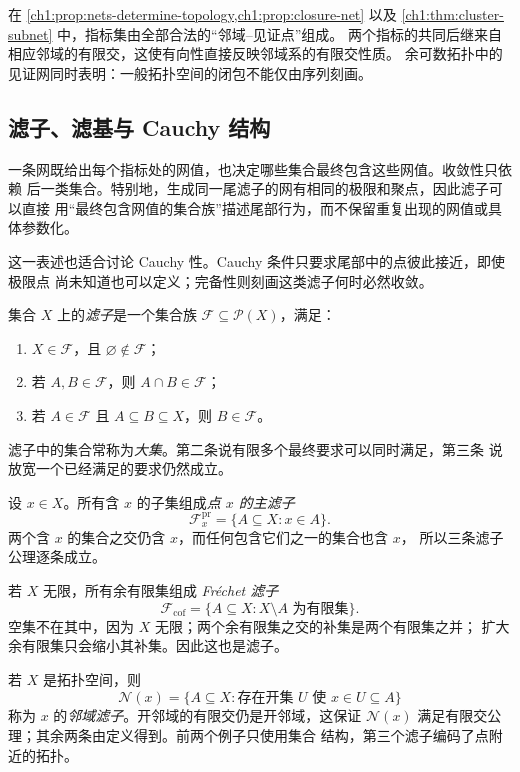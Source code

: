 \begin{remark}[见证网的构造]
在 \cref{ch1:prop:nets-determine-topology,ch1:prop:closure-net} 以及
\cref{ch1:thm:cluster-subnet} 中，指标集由全部合法的“邻域--见证点”组成。
两个指标的共同后继来自相应邻域的有限交，这使有向性直接反映邻域系的有限交性质。
余可数拓扑中的见证网同时表明：一般拓扑空间的闭包不能仅由序列刻画。
\end{remark}


\subsection{滤子、滤基与 Cauchy 结构}
\label{ch1:subsec:filters}

一条网既给出每个指标处的网值，也决定哪些集合最终包含这些网值。收敛性只依赖
后一类集合。特别地，生成同一尾滤子的网有相同的极限和聚点，因此滤子可以直接
用“最终包含网值的集合族”描述尾部行为，而不保留重复出现的网值或具体参数化。

这一表述也适合讨论 Cauchy 性。Cauchy 条件只要求尾部中的点彼此接近，即使极限点
尚未知道也可以定义；完备性则刻画这类滤子何时必然收敛。

\begin{definition}[滤子]
集合 \(X\) 上的\emph{滤子}是一个集合族
\(\mathcal F\subseteq\mathcal P(X)\)，满足：
\begin{enumerate}
  \item \(X\in\mathcal F\)，且 \(\varnothing\notin\mathcal F\)；
  \item 若 \(A,B\in\mathcal F\)，则 \(A\cap B\in\mathcal F\)；
  \item 若 \(A\in\mathcal F\) 且 \(A\subseteq B\subseteq X\)，则
        \(B\in\mathcal F\)。
\end{enumerate}
滤子中的集合常称为\emph{大集}。第二条说有限多个最终要求可以同时满足，第三条
说放宽一个已经满足的要求仍然成立。
\end{definition}

\begin{example}[三个基本滤子]
设 \(x\in X\)。所有含 \(x\) 的子集组成\emph{点 \(x\) 的主滤子}
\[
 \mathcal F_x^{\mathrm{pr}}=\{A\subseteq X:x\in A\}.
\]
两个含 \(x\) 的集合之交仍含 \(x\)，而任何包含它们之一的集合也含 \(x\)，
所以三条滤子公理逐条成立。

若 \(X\) 无限，所有余有限集组成 \emph{Fr\'echet 滤子}
\[
 \mathcal F_{\mathrm{cof}}=\{A\subseteq X:X\setminus A\text{ 为有限集}\}.
\]
空集不在其中，因为 \(X\) 无限；两个余有限集之交的补集是两个有限集之并；
扩大余有限集只会缩小其补集。因此这也是滤子。

若 \(X\) 是拓扑空间，则
\[
 \mathcal N(x)=
 \{A\subseteq X:\text{存在开集 }U\text{ 使 }x\in U\subseteq A\}
\]
称为 \(x\) 的\emph{邻域滤子}。开邻域的有限交仍是开邻域，这保证
\(\mathcal N(x)\) 满足有限交公理；其余两条由定义得到。前两个例子只使用集合
结构，第三个滤子编码了点附近的拓扑。
\end{example}

